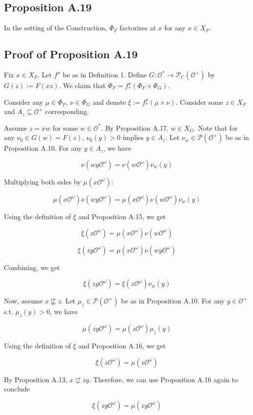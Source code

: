 \documentclass[a4paper]{article}
\newcommand{\Prob}{\mathcal{P}}
\newcommand{\Obs}{\mathcal{O}}
\newcommand{\ObsO}{\Obs^\omega}
\newcommand{\CC}{\mathcal{P}_{\operatorname{C}}}
\begin{document}
\subsection{Proposition A.19}

In the setting of the Construction, ${\Phi_F}$ factorizes at ${x}$ for any ${x \in X_F}$.

\subsection{Proof of Proposition A.19}

Fix ${x \in X_F}$. Let ${f^x}$ be as in Definition 1. Define ${G: \Obs^* \rightarrow \CC(\Obs^+)}$ by ${G(z):=F(xz)}$. We claim that ${\Phi_F = f^x_*(\Phi_F \times \Phi_G)}$.

Consider any ${\mu \in \Phi_F}$, ${\nu \in \Phi_G}$ and denote ${\xi:=f^x_*(\mu \times \nu)}$. Consider some ${z \in X_F}$ and ${A_z \subseteq \Obs^+}$ corresponding.

Assume ${z = xw}$ for some ${w \in \Obs^*}$. By Proposition A.17, ${w \in X_G}$. Note that for any ${\nu_0 \in G(w)=F(z)}$, ${\nu_0(y) > 0}$ implies ${y \in A_z}$. Let ${\nu_w \in \Prob(\Obs^+)}$ be as in Proposition A.10. For any ${y \in A_z}$, we have

$$\nu(wy\ObsO) = \nu(w\ObsO) \nu_w(y)$$

Multiplying both sides by ${\mu(x\ObsO)}$:

$$\mu(x\ObsO) \nu(wy\ObsO) = \mu(x\ObsO) \nu(w\ObsO) \nu_w(y)$$

Using the definition of ${\xi}$ and Proposition A.15, we get

$${\xi(z\ObsO)=\mu(x\ObsO) \nu(w\ObsO)}$$

$$\xi(zy\ObsO) = \mu(x\ObsO) \nu(wy\ObsO)$$

Combining, we get

$$\xi(zy\ObsO) = \xi(z\ObsO) \nu_w(y)$$

Now, assume ${x \not\sqsubseteq z}$. Let ${\mu_z \in \Prob(\Obs^+)}$ be as in Proposition A.10. For any ${y \in \Obs^+}$ s.t. ${\mu_z(y) > 0}$, we have

$$\mu(zy\ObsO)=\mu(z\ObsO) \mu_z(y)$$

Using the definition of ${\xi}$ and Proposition A.16, we get

$$\xi(z\ObsO)=\mu(z\ObsO)$$

By Proposition A.13, ${x \not\sqsubset zy}$. Therefore, we can use Proposition A.16 again to conclude

$$\xi(zy\ObsO)=\mu(zy\ObsO)$$
\end{document}
